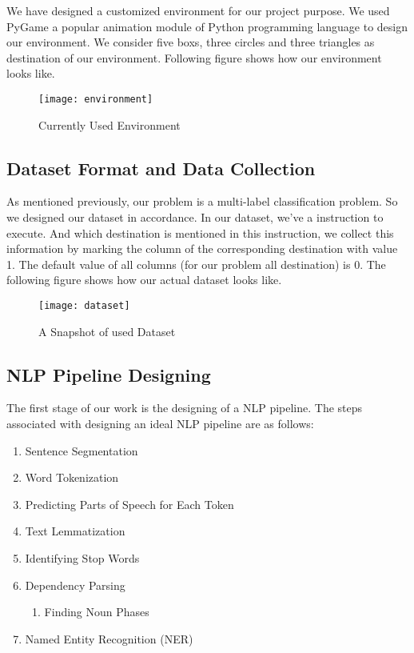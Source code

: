 We have designed a customized environment for our project purpose. We used PyGame a popular animation module of Python programming language to design our environment. We consider five boxs, three circles and three triangles as destination of our environment. Following figure shows how our environment looks like. \\

\begin{figure}[h]
    \centering
    \texttt{[image: environment]}
    \caption{Currently Used Environment}
\end{figure}
\vline

\subsection{Dataset Format and Data Collection}
As mentioned previously, our problem is a multi-label classification problem. So we designed our dataset in accordance. In our dataset, we've a instruction to execute. And which destination is mentioned in this instruction, we collect this information by marking the column of the corresponding destination with value 1. The default value of all columns (for our problem all destination) is 0. The following figure shows how our actual dataset looks like. \\

\begin{figure}[h]
    \centering
    \texttt{[image: dataset]}
    \caption{A Snapshot of used Dataset}
\end{figure}
\vline

\subsection{NLP Pipeline Designing}

The first stage of our work is the designing of a NLP pipeline. The steps associated with designing an ideal NLP pipeline are as follows: \\

\begin{enumerate}
    \item Sentence Segmentation
    \item Word Tokenization
    \item Predicting Parts of Speech for Each Token
    \item Text Lemmatization
    \item Identifying Stop Words
    \item Dependency Parsing
    \begin{enumerate}
        \item Finding Noun Phases
    \end{enumerate}
    \item Named Entity Recognition (NER)
\end{enumerate}
\vline

